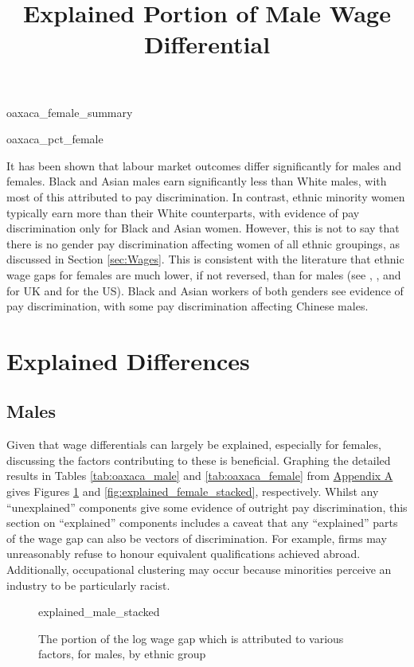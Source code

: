 \documentclass[class=article, crop=false]{standalone}
\begin{document}
{oaxaca_female_summary}

{oaxaca_pct_female}

It has been shown that labour market outcomes differ significantly for males and females. Black and Asian males earn significantly less than White males, with most of this attributed to pay discrimination. In contrast, ethnic minority women typically earn more than their White counterparts, with evidence of pay discrimination only for Black and Asian women. However, this is not to say that there is no gender pay discrimination affecting women of all ethnic groupings, as discussed in Section \ref{sec:Wages}. This is consistent with the literature that ethnic wage gaps for females are much lower, if not reversed, than for males (see \citet{ONSe}, \citet{Metcalf}, and \citet{Longhi3} for UK and \citet{Bayard} for the US). Black and Asian workers of both genders see evidence of pay discrimination, with some pay discrimination affecting Chinese males. %

\section{Explained Differences}
\label{sec:explained_diff}
\subsection{Males}
\label{sec:male_explained}
Given that wage differentials can largely be explained, especially for females, discussing the factors contributing to these is beneficial. Graphing the detailed results in Tables \ref{tab:oaxaca_male} and \ref{tab:oaxaca_female} from \hyperref[sec:appendixA]{Appendix A} gives Figures \ref{fig:explained_male_stacked} and \ref{fig:explained_female_stacked}, respectively. Whilst any \enquote{unexplained} components give some evidence of outright pay discrimination, this section on \enquote{explained} components includes a caveat that any \enquote{explained} parts of the wage gap can also be vectors of discrimination. For example, firms may unreasonably refuse to honour equivalent qualifications achieved abroad. Additionally, occupational clustering may occur because minorities perceive an industry to be particularly racist. 

\begin{figure}[h]
\centering
    \title{Explained Portion of Male Wage Differential}
    {explained_male_stacked}
    \caption{The portion of the log wage gap which is attributed to various factors, for males, by ethnic group}
    \label{fig:explained_male_stacked}
\end{figure}
\end{document}
